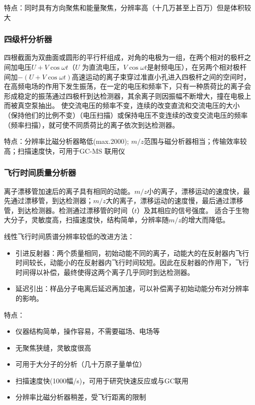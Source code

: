 特点：同时具有方向聚焦和能量聚焦，分辨率高（十几万甚至上百万）但是体积较大
\subsubsection*{四级杆分析器}
四根截面为双曲面或圆形的平行杆组成，对角的电极为一组，在两个相对的极杆之间加电压$U+V\cos\omega t$（$U$ 为直流电压，$V\cos\omega t$是射频电压），在另两个相对极杆间加$-(U+V\cos\omega t)$高速运动的离子束穿过准直小孔进入四极杆之间的空间时，在高频电场的作用下发生振荡，在一定的电压和频率下，只有一种质荷比的离子会形成稳定的振荡通过四极杆到达检测器，其余离子则因振幅不断增大，撞在电极上而被真空泵抽出。 使交流电压的频率不变，连续的改变直流和交流电压的大小（保持他们的比例不变）（电压扫描）或保持电压不变连续的改变交流电压的频率（频率扫描），就可使不同质荷比的离子依次到达检测器。

特点：分辨率比磁分析器略低(max.2000); $m/z$范围与磁分析器相当；传输效率较高；扫描速度快，可用于GC-MS 联用仪

\subsubsection*{飞行时间质量分析器}
离子漂移管加速后的离子具有相同的动能。$m/z$小的离子，漂移运动的速度快，最先通过漂移管，到达检测器；$m/z$大的离子，漂移运动的速度慢，最后通过漂移管，到达检测器。检测通过漂移管的时间（$t$）及其相应的信号强度。
适合于生物大分子，灵敏度高，扫描速度快，结构简单，分辨率随$m/z$的增大而降低。

线性飞行时间质谱分辨率较低的改进方法： 
\begin{itemize}
    \item  引进反射器：两个质量相同，初始动能不同的离子，动能大的在反射器内飞行时间较长，动能小的在反射器内飞行时间较短。因此在反射器的作用下，飞行时间得以补偿，最终使得这两个离子几乎同时到达检测器。
    \item 延迟引出：样品分子电离后延迟再加速，可以补偿离子初始动能分布对分辨率的影响。
\end{itemize}

特点：
\begin{itemize}
    \item 仪器结构简单，操作容易，不需要磁场、电场等
    \item 无聚焦狭缝，灵敏度很高
    \item 可用于大分子的分析（几十万原子量单位）
    \item 扫描速度快(1000幅/s)，可用于研究快速反应或与GC联用
    \item 分辨率比磁分析器稍差，受飞行距离的限制
\end{itemize}

